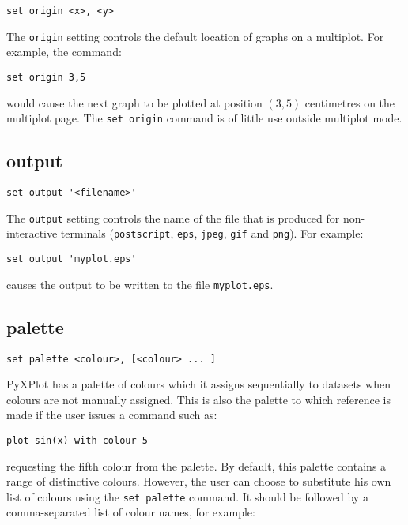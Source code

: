\begin{verbatim}
set origin <x>, <y>
\end{verbatim}

The {\tt origin} setting controls the default location of graphs on a multiplot.
For example, the command:

\begin{verbatim}
set origin 3,5
\end{verbatim}

\noindent would cause the next graph to be plotted at position $(3,5)$ centimetres on the
multiplot page. The {\tt set origin} command is of little use outside multiplot
mode.


\subsection{output}

\begin{verbatim}
set output '<filename>'
\end{verbatim}

The {\tt output} setting controls the name of the file that is produced for
non-interactive terminals ({\tt postscript}, {\tt eps}, {\tt jpeg}, {\tt gif}
and {\tt png}).  For example:

\begin{verbatim}
set output 'myplot.eps'
\end{verbatim}

\noindent causes the output to be written to the file {\tt myplot.eps}.


\subsection{palette}

\begin{verbatim}
set palette <colour>, [<colour> ... ]
\end{verbatim}

PyXPlot has a palette of colours which it assigns sequentially to datasets when
colours are not manually assigned. This is also the palette to which reference
is made if the user issues a command such as:

\begin{verbatim}
plot sin(x) with colour 5
\end{verbatim}

\noindent requesting the fifth colour from the palette. By default, this palette
contains a range of distinctive colours. However, the user can choose to
substitute his own list of colours using the {\tt set palette} command. It
should be followed by a comma-separated list of colour names, for example:

